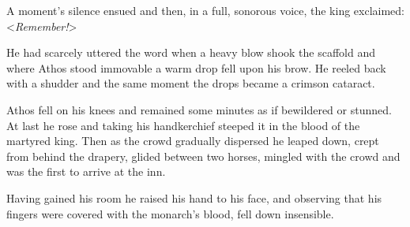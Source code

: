 A moment's silence ensued and then, in a full, sonorous voice, the king exclaimed: <\textit{Remember!}>

He had scarcely uttered the word when a heavy blow shook the scaffold and where Athos stood immovable a warm drop fell upon his brow. He reeled back with a shudder and the same moment the drops became a crimson cataract.

Athos fell on his knees and remained some minutes as if bewildered or stunned. At last he rose and taking his handkerchief steeped it in the blood of the martyred king. Then as the crowd gradually dispersed he leaped down, crept from behind the drapery, glided between two horses, mingled with the crowd and was the first to arrive at the inn.

Having gained his room he raised his hand to his face, and observing that his fingers were covered with the monarch's blood, fell down insensible. 